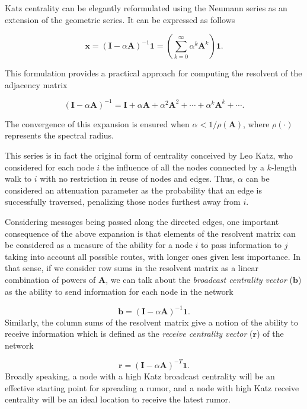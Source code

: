 Katz centrality can be elegantly reformulated using the Neumann series as an extension of the geometric series. It can be expressed as follows

\begin{equation}
\label{eqn:katz2}
    \mathbf{x}=(\mathbf{I}-\alpha\mathbf{A})^{-1}\mathbf{1}=\left(\sum_{k=0}^{\infty}\alpha^k \mathbf{A}^k\right)\mathbf{1}.
\end{equation}

This formulation provides a practical approach for computing the resolvent of the adjacency matrix

\begin{equation}
\label{eqn:katz3}
    (\mathbf{I}-\alpha\mathbf{A})^{-1} = \mathbf{I} + \alpha\mathbf{A} + \alpha^2\mathbf{A}^2 + \cdots + \alpha^k\mathbf{A}^k + \cdots .
\end{equation}

The convergence of this expansion is ensured when $\alpha<1/\rho(\mathbf{A})$, where $\rho(\cdot)$ represents the spectral radius.

This series is in fact the original form of centrality conceived by Leo Katz, who considered for each node $i$ the influence of all the nodes connected by a $k$-length walk to $i$ with no restriction in reuse of nodes and edges. Thus, $\alpha$ can be considered an attenuation parameter as the probability that an edge is successfully traversed, penalizing those nodes furthest away from $i$. 

Considering messages being passed along the directed edges, one important consequence of the above expansion is that elements of the resolvent matrix can be considered as a measure of the ability for a node $i$ to pass information to $j$ taking into account all possible routes, with longer ones given less importance. In that sense, if we consider row sums in the resolvent matrix as a linear combination of powers of $\mathbf{A}$, we can talk about the \textit{broadcast centrality vector} ($\mathbf{b}$) as the ability to send information for each node in the network 

\begin{equation}
\label{eqn:broad}
    \mathbf{b}=(\mathbf{I}-\alpha\mathbf{A})^{-1} \mathbf{1}.
\end{equation}
Similarly, the column sums of the resolvent matrix give a notion of the ability to receive information which is defined as the \textit{receive centrality vector} ($\mathbf{r}$) of the network

\begin{equation}
\label{eqn:receiv}
    \mathbf{r} = (\mathbf{I}-\alpha\mathbf{A})^{-T} \mathbf{1}.
\end{equation}
Broadly speaking, a node with a high Katz broadcast centrality will be an effective starting point for spreading a rumor, and a node with high Katz receive centrality will be an ideal location to receive the latest rumor.

